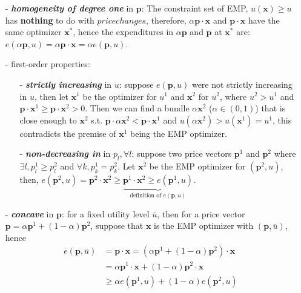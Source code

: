 \begin{enumerate}
    \item[-] \textit{\textbf{homogeneity of degree one}} in $\mathbf{p}$: The constraint set of EMP, $u(\mathbf{x})\geq u$ has \textbf{nothing} to do with $price changes$, therefore, $\alpha\mathbf{p}\cdot \mathbf{x}$ and $\mathbf{p}\cdot \mathbf{x}$ have the same optimizer $\mathbf{x}^*$, hence the expenditures in $\alpha\mathbf{p}$ and $\mathbf{p}$ at $\mathbf{x}^*$ are: $e(\alpha\mathbf{p},u)=\alpha\mathbf{p}\cdot\mathbf{x}=\alpha e(\mathbf{p},u)$.
    \item[-] first-order properties:
    \begin{enumerate}
        \item[-] \textit{\textbf{strictly increasing}} in $u$: suppose $e(\mathbf{p},u)$ were not strictly increasing in $u$, then let $\mathbf{x}^1$ be the optimizer for $u^1$ and $\mathbf{x}^2$ for $u^2$, where $u^2>u^1$ and $\mathbf{p}\cdot\mathbf{x}^1\geq \mathbf{p}\cdot\mathbf{x}^2>0$. Then we can find a bundle $\alpha \mathbf{x}^2$ ($\alpha \in (0,1)$) that is close enough to $\mathbf{x}^2$ s.t. $\mathbf{p}\cdot\alpha \mathbf{x}^2<\mathbf{p}\cdot \mathbf{x}^1$ and $u(\alpha\mathbf{x}^2)>u(\mathbf{x}^1)=u^1$, this contradicts the premise of $\mathbf{x}^1$ being the EMP optimizer.
        \item[-] \textit{\textbf{non-decreasing in}} in $p_l,\forall l$: suppose two price vectors $\mathbf{p}^1$ and $\mathbf{p}^2$ where $\exists l,p^1_l\geq p^2_l$ and $\forall k, p^1_k=p^2_k$. Let $\mathbf{x}^2$ be the EMP optimizer for $(\mathbf{p}^2,u)$, then, $e(\mathbf{p}^2,u)=\mathbf{p}^2\cdot \mathbf{x}^2\geq \underbrace{\mathbf{p}^1\cdot \mathbf{x}^2\geq e(\mathbf{p}^1,u)}_{\text{definition of }e(\mathbf{p},u)}$.
    \end{enumerate}
    \item[-] \textit{\textbf{concave}} in $\mathbf{p}$: for a fixed utility level $\bar{u}$, then for a price vector $\mathbf{p}=\alpha\mathbf{p}^1+(1-\alpha)\mathbf{p}^2$, suppose that $\mathbf{x}$ is the EMP optimizer with $(\mathbf{p},\bar{u})$, hence 
    \begin{align*}
        e(\mathbf{p},\bar{u}) & = \mathbf{p}\cdot\mathbf{x} = \left(\alpha\mathbf{p}^1+(1-\alpha)\mathbf{p}^2\right)\cdot \mathbf{x}\\
        & = \alpha \mathbf{p}^1\cdot \mathbf{x} + (1-\alpha)\mathbf{p}^2\cdot \mathbf{x}\\
        & \geq \alpha e(\mathbf{p}^1,u)+(1-\alpha) e(\mathbf{p}^2,u)
    \end{align*}

\end{enumerate}
